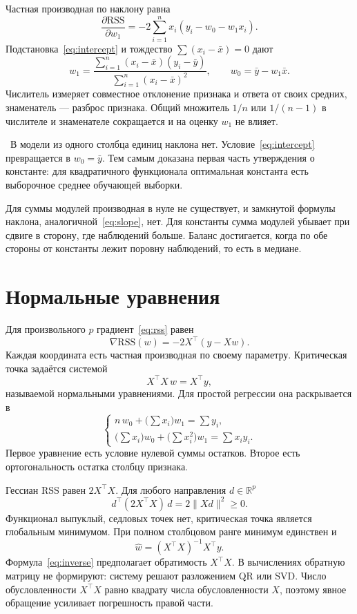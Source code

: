 \documentclass[11pt,a4paper]{article}
\newcommand{\Rem}{\par\noindent{\color{navy}\textbf{Замечание.}}\ }
\begin{document}
Частная производная по наклону равна
\[
\frac{\partial\mathrm{RSS}}{\partial w_1}
=-2\sum_{i=1}^{n}x_i(y_i-w_0-w_1 x_i).
\]
Подстановка~\eqref{eq:intercept} и тождество \(\sum(x_i-\bar x)=0\) дают
\begin{equation}
\label{eq:slope}
w_1=
\frac{\sum_{i=1}^{n}(x_i-\bar x)(y_i-\bar y)}
{\sum_{i=1}^{n}(x_i-\bar x)^{2}},
\qquad
w_0=\bar y-w_1\bar x.
\end{equation}
Числитель измеряет совместное отклонение признака и ответа от своих средних, знаменатель --- разброс признака. Общий множитель \(1/n\) или \(1/(n-1)\) в числителе и знаменателе сокращается и на оценку \(w_1\) не влияет.

\Rem В модели из одного столбца единиц наклона нет. Условие~\eqref{eq:intercept} превращается в \(w_0=\bar y\). Тем самым доказана первая часть утверждения о константе: для квадратичного функционала оптимальная константа есть выборочное среднее обучающей выборки.

Для суммы модулей производная в нуле не существует, и замкнутой формулы наклона, аналогичной~\eqref{eq:slope}, нет. Для константы сумма модулей убывает при сдвиге в сторону, где наблюдений больше. Баланс достигается, когда по обе стороны от константы лежит поровну наблюдений, то есть в медиане.

\section{Нормальные уравнения}

Для произвольного \(p\) градиент~\eqref{eq:rss} равен
\begin{equation}
\label{eq:grad}
\nabla\mathrm{RSS}(w)=-2X^{\top}(y-Xw).
\end{equation}
Каждая координата есть частная производная по своему параметру. Критическая точка задаётся системой
\begin{equation}
\label{eq:normal}
X^{\top}X\,w=X^{\top}y,
\end{equation}
называемой нормальными уравнениями. Для простой регрессии она раскрывается в
\[
\begin{cases}
n\,w_0+\bigl(\sum x_i\bigr)w_1=\sum y_i,\\[1mm]
\bigl(\sum x_i\bigr)w_0+\bigl(\sum x_i^{2}\bigr)w_1=\sum x_i y_i.
\end{cases}
\]
Первое уравнение есть условие нулевой суммы остатков. Второе есть ортогональность остатка столбцу признака.

Гессиан \(\mathrm{RSS}\) равен \(2X^{\top}X\). Для любого направления \(d\in\mathbb R^{p}\)
\[
d^{\top}(2X^{\top}X)\,d=2\lVert Xd\rVert^{2}\ge 0.
\]
Функционал выпуклый, седловых точек нет, критическая точка является глобальным минимумом. При полном столбцовом ранге минимум единствен и
\begin{equation}
\label{eq:inverse}
\hat w=(X^{\top}X)^{-1}X^{\top}y.
\end{equation}
Формула~\eqref{eq:inverse} предполагает обратимость \(X^{\top}X\). В вычислениях обратную матрицу не формируют: систему решают разложением QR или SVD. Число обусловленности \(X^{\top}X\) равно квадрату числа обусловленности \(X\), поэтому явное обращение усиливает погрешность правой части.
\end{document}
